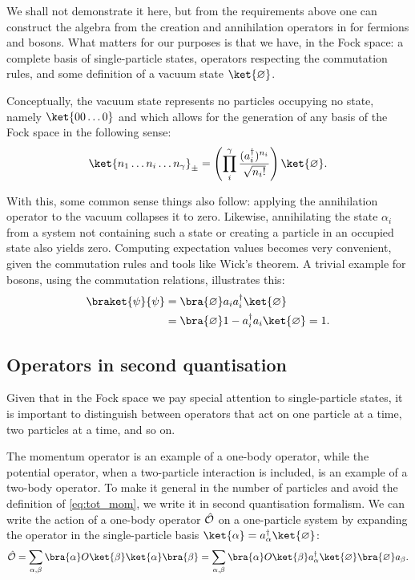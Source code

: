 We shall not demonstrate it here, but from the requirements above one can construct the algebra from the creation and annihilation operators in  for fermions and bosons. What matters for our purposes is that we have, in the Fock space: a complete basis of single-particle states, operators respecting the commutation rules, and some definition of a vacuum state $\ket{\varnothing}$.

Conceptually, the vacuum state represents no particles occupying no state, namely $\ket{00\ldots 0}$ and which allows for the generation of any basis of the Fock space in the following sense:
\begin{align*}
    \ket{n_1 \ldots n_i \ldots n_\gamma}_{\pm} = \left(\prod_i^\gamma \frac{(a_i^\dagger)^{n_i}}{\sqrt{n_i!}}\right)\ket{\varnothing}.
\end{align*}

With this, some common sense things also follow: applying the annihilation operator to the vacuum collapses it to zero. Likewise, annihilating the state $\alpha_i$ from a system not containing such a state or creating a particle in an occupied state also yields zero. Computing expectation values becomes very convenient, given the commutation rules and tools like Wick's theorem. A trivial example for bosons, using the commutation relations, illustrates this:
\begin{align*}
    \braket{\psi}{\psi} &= \bra{\varnothing} a_i a_i^\dagger \ket{\varnothing}\\
                        &= \bra{\varnothing} 1 -  a_i^\dagger a_i  \ket{\varnothing} = 1.
\end{align*}     

\subsection{Operators in second quantisation}

Given that in the Fock space we pay special attention to single-particle states, it is important to distinguish between operators that act on one particle at a time, two particles at a time, and so on. 

The momentum operator is an example of a one-body operator, while the potential operator, when a two-particle interaction is included, is an example of a two-body operator. To make it general in the number of particles and avoid the definition of \eqref{eq:tot_mom}, we write it in second quantisation formalism. We can write the action of a one-body operator $\hat{\mathcal{O}}$ on a one-particle system by expanding the operator in the single-particle basis $\ket{\alpha} = a_\alpha^\dagger \ket{\varnothing}$:
\begin{align}
    \op{O} =\sum_{\alpha,\beta} \bra{\alpha} O\ket{\beta}\ket{\alpha}\bra{\beta} =\sum_{\alpha,\beta} \bra{\alpha} O\ket{\beta}a_\alpha^\dagger\ket{\varnothing}\bra{\varnothing}a_{\beta}.
    \label{eq:1bo}
\end{align}

